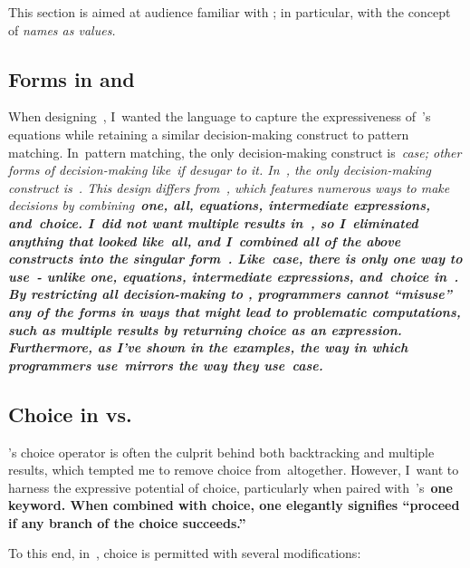 \documentclass[manuscript,screen 12pt, nonacm]{acmart}
\begin{document}

    This section is aimed at audience familiar with \VC; in particular, with the
    concept of \it{names as values}.
    
    \subsection{Forms in \VC and \VMinus}
    
    When designing~\VMinus, I~wanted the language to capture the expressiveness
    of~\VC's equations while retaining a similar decision-making construct to
    pattern matching. In~pattern matching, the only decision-making
    construct is~\it{case}; other forms of decision-making like~\it{if}
    desugar to it. In~\VMinus, the only decision-making construct is~\iffibf.
    This design differs from~\VC, which features numerous ways to make decisions by
    combining~\bf{one}, \bf{all}, equations, intermediate expressions,
    and~choice. I~did not want multiple results in~\VMinus, so I~eliminated
    anything that looked like~\bf{all}, and I~combined all of the above
    constructs into the singular form~\iffibf. Like~\it{case}, there is only one
    way to use~\iffibf- unlike \bf{one}, equations, intermediate expressions,
    and~choice in~\VC. By restricting all decision-making to \iffibf,
    programmers cannot ``misuse'' any of the forms in ways that might lead to
    problematic computations, such as multiple results by returning choice as an
    expression. Furthermore, as I've shown in the examples, the way in which programmers use~\iffibf mirrors
    the way they use~\it{case}. 
    
    \subsection{Choice in \VMinus vs. \VC}

    \VC's choice operator is often the culprit behind both
    backtracking and multiple results, which tempted me to remove choice
    from~\VMinus altogether. However, I~want to harness the expressive potential
    of choice, particularly when paired with~\VC's~\bf{one} keyword. When
    combined with choice, \bf{one} elegantly signifies ``proceed if any branch of
    the choice succeeds.'' 
    
    To this end, in~\VMinus, choice is permitted with several modifications:
    
\end{document}
